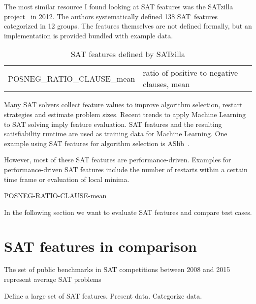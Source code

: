 The most similar resource I found looking at SAT features was the
SATzilla project~\cite{satzilla2004,satzilla2008} in 2012. The authors systematically defined
138 SAT~features categorized in 12 groups. The features themselves are not
defined formally, but an implementation is provided bundled with example data.

\begin{table}[!h]
  \begin{center}
    \begin{tabular}{rl}
      \small{POSNEG\_RATIO\_CLAUSE\_mean} & ratio of positive to negative clauses, mean
    \end{tabular}
    \caption{SAT features defined by SATzilla}
    \label{tab:satzilla-features}
  \end{center}
\end{table}

Many SAT solvers collect feature values to improve algorithm selection,
restart strategies and estimate problem sizes. Recent trends to apply Machine
Learning to SAT solving imply feature evaluation. SAT features and the resulting
satisfiability runtime are used as training data for Machine Learning. One example
using SAT features for algorithm selection is ASlib~\cite{aslib}.

However, most of these SAT features are performance-driven.
Examples for performance-driven SAT features include the number of
restarts within a certain time frame or evaluation of local minima.



POSNEG-RATIO-CLAUSE-mean

In the following section we want to evaluate SAT features and
compare test cases.

\section{SAT features in comparison}

\begin{prop}
  The set of public benchmarks in SAT competitions between 2008 and 2015
  represent average SAT problems
\end{prop}

Define a large set of SAT features.
Present data.
Categorize data.

